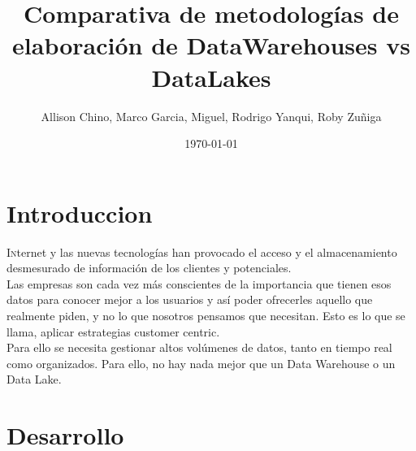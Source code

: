\documentclass[twoside,twocolumn]{article}
\title{Comparativa de metodologías de elaboración de DataWarehouses vs DataLakes}
\author{Allison Chino, Marco Garcia, Miguel, Rodrigo Yanqui, Roby Zuñiga}
\date{\today}
\begin{document}
\maketitle


\section{Introduccion}
\lettrine[nindent=0em,lines=3]{I}nternet y las nuevas tecnologías han provocado el acceso y el almacenamiento desmesurado de información de los clientes y potenciales.\\[0.1in]
Las empresas son cada vez más conscientes de la importancia que tienen esos datos para conocer mejor a los usuarios y así poder ofrecerles aquello que realmente piden, y no lo que nosotros pensamos que necesitan. Esto es lo que se llama, aplicar estrategias customer centric.\\[0.1in]
Para ello se necesita gestionar altos volúmenes de datos, tanto en tiempo real como organizados. Para ello, no hay nada mejor que un Data Warehouse o un Data Lake.


\section{Desarrollo}
\end{document}
